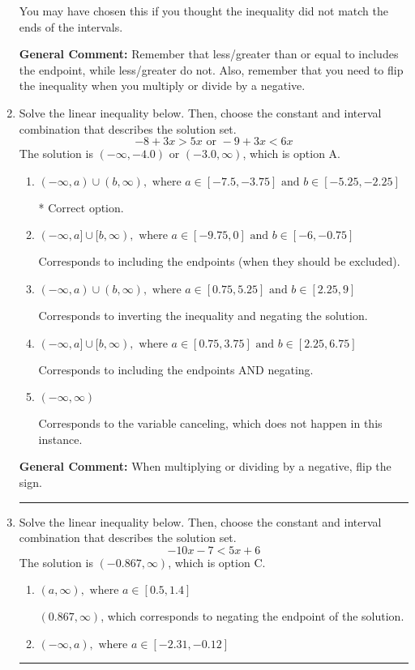 \documentclass{extbook}[14pt]
\newcommand{\litem}[1]{\item #1

\rule{\textwidth}{0.4pt}}
\begin{document}
\begin{enumerate}
{\begin{enumerate}[label=\Alph*.]
You may have chosen this if you thought the inequality did not match the ends of the intervals.
\end{enumerate}

\textbf{General Comment:} Remember that less/greater than or equal to includes the endpoint, while less/greater do not. Also, remember that you need to flip the inequality when you multiply or divide by a negative.
}
\litem{
Solve the linear inequality below. Then, choose the constant and interval combination that describes the solution set.
\[ -8 + 3 x > 5 x \text{ or } -9 + 3 x < 6 x \]The solution is \( (-\infty, -4.0) \text{ or } (-3.0, \infty) \), which is option A.\begin{enumerate}[label=\Alph*.]
\item \( (-\infty, a) \cup (b, \infty), \text{ where } a \in [-7.5, -3.75] \text{ and } b \in [-5.25, -2.25] \)

 * Correct option.
\item \( (-\infty, a] \cup [b, \infty), \text{ where } a \in [-9.75, 0] \text{ and } b \in [-6, -0.75] \)

Corresponds to including the endpoints (when they should be excluded).
\item \( (-\infty, a) \cup (b, \infty), \text{ where } a \in [0.75, 5.25] \text{ and } b \in [2.25, 9] \)

Corresponds to inverting the inequality and negating the solution.
\item \( (-\infty, a] \cup [b, \infty), \text{ where } a \in [0.75, 3.75] \text{ and } b \in [2.25, 6.75] \)

Corresponds to including the endpoints AND negating.
\item \( (-\infty, \infty) \)

Corresponds to the variable canceling, which does not happen in this instance.
\end{enumerate}

\textbf{General Comment:} When multiplying or dividing by a negative, flip the sign.
}
\litem{
Solve the linear inequality below. Then, choose the constant and interval combination that describes the solution set.
\[ -10x -7 < 5x + 6 \]The solution is \( (-0.867, \infty) \), which is option C.\begin{enumerate}[label=\Alph*.]
\item \( (a, \infty), \text{ where } a \in [0.5, 1.4] \)

 $(0.867, \infty)$, which corresponds to negating the endpoint of the solution.
\item \( (-\infty, a), \text{ where } a \in [-2.31, -0.12] \)


\end{enumerate}}
\end{enumerate}
\end{document}

